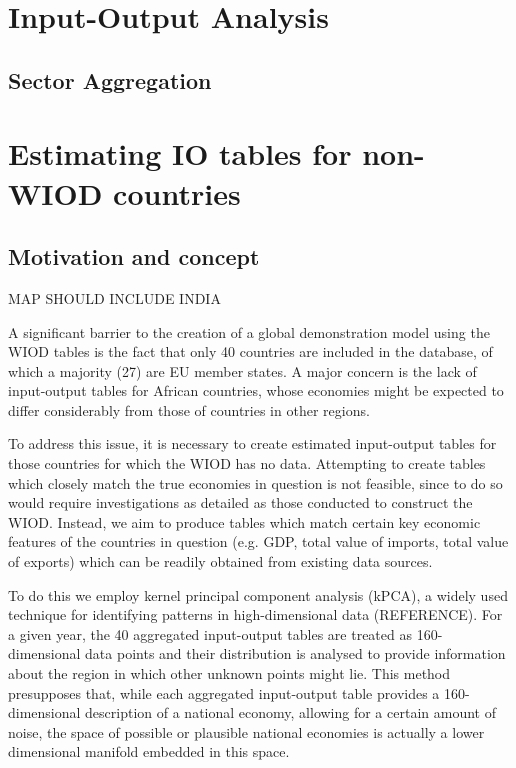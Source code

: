 \documentclass[preprint,authoryear,3p]{elsarticle}
\begin{document}
\section{Input-Output Analysis}



\subsection{Sector Aggregation}





\pagebreak





\section{Estimating IO tables for non-WIOD countries}

\subsection{Motivation and concept}

MAP SHOULD INCLUDE INDIA

A significant barrier to the creation of a global demonstration model using the WIOD tables is the fact that only 40 countries are included in the database, of which a majority (27) are EU member states. A major concern is the lack of input-output tables for African countries, whose economies might be expected to differ considerably from those of countries in other regions.

To address this issue, it is necessary to create estimated input-output tables for those countries for which the WIOD has no data. Attempting to create tables which closely match the true economies in question is not feasible, since to do so would require investigations as detailed as those conducted to construct the WIOD. Instead, we aim to produce tables which match certain key economic features of the countries in question (e.g. GDP, total value of imports, total value of exports) which can be readily obtained from existing data sources.

To do this we employ kernel principal component analysis (kPCA), a widely used technique for identifying patterns in high-dimensional data (REFERENCE). For a given year, the 40 aggregated input-output tables are treated as 160-dimensional data points and their distribution is analysed to provide information about the region in which other unknown points might lie. This method presupposes that, while each aggregated input-output table provides a 160-dimensional description of a national economy, allowing for a certain amount of noise, the space of possible or plausible national economies is actually a lower dimensional manifold embedded in this space.
\end{document}
